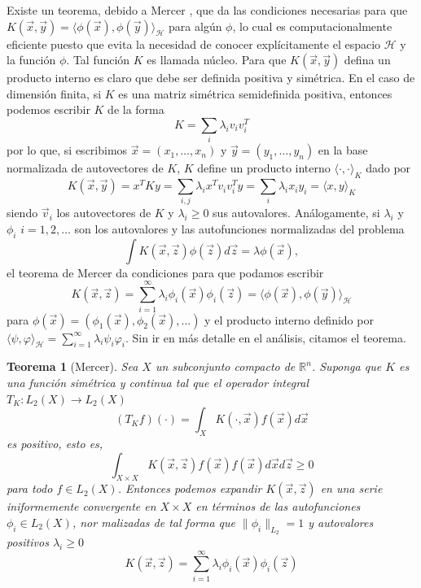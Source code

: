 \documentclass[letterpaper,12pt]{book}
\newtheorem{theorem}{Teorema}
\begin{document}
Existe un teorema, debido a Mercer \cite{mercer_functions_1909}, que da las condiciones necesarias para que $K(\vec{x},\vec{y}) = \langle\phi(\vec{x}),\phi(\vec{y})\rangle_{\mathcal{H}}$ para algún $\phi$, lo cual es computacionalmente eficiente puesto que evita la necesidad de conocer explícitamente el espacio $\mathcal{H}$ y la función $\phi$. Tal función $K$ es llamada núcleo. Para que $K(\vec{x},\vec{y})$ defina un producto interno es claro que debe ser definida positiva y simétrica. En el caso de dimensión finita, si $K$ es una matriz simétrica semidefinida positiva, entonces podemos escribir $K$ de la forma
\begin{equation}
 K =\sum_i\lambda_i v_iv_i^T
\end{equation}
por lo que, si escribimos $\vec{x} = (x_1,\dots,x_n)$ y $\vec{y}=(y_1,\dots,y_n)$ en la base normalizada de autovectores de $K$, $K$ define un producto interno $\langle\cdot,\cdot\rangle_{K}$ dado por
\begin{equation}
 K(\vec{x},\vec{y}) =x^TKy = \sum_{i,j}\lambda_ix^Tv_iv_i^Ty = \sum_i \lambda_ix_iy_i = \langle x,y\rangle_{K}
\end{equation}
siendo $\vec{v}_i$ los autovectores de $K$ y $\lambda_i\geq 0$ sus autovalores. Análogamente, si $\lambda_i$ y $\phi_i$ $i = 1,2,\dots$ son los autovalores y las autofunciones normalizadas del problema
\begin{equation}
  \int K(\vec{x},\vec{z})\phi(\vec{z})d\vec{z} = \lambda\phi(\vec{x}), 
\end{equation}
el teorema de Mercer da condiciones para que podamos escribir 
\begin{equation}
  K(\vec{x},\vec{z}) = \sum_{i=1}^{\infty}\lambda_i\phi_i(\vec{x})\phi_i(\vec{z}) =  \langle \phi(\vec{x}), \phi(\vec{y})\rangle_{\mathcal{H}}
\end{equation}
para $\phi(\vec{x}) = (\phi_1(\vec{x}), \phi_2(\vec{x}),\dots)$ y el producto interno definido por $\langle \psi,\varphi \rangle_{\mathcal{H}} = \sum_{i=1}^{\infty}\lambda_i\psi_i\varphi_i$. Sin ir en más detalle en el análisis, citamos el teorema.
\begin{theorem}[Mercer]
  Sea $X$ un subconjunto compacto de $\mathbb{R}^n$. Suponga que $K$ es una función simétrica y continua tal que el operador integral $T_K:L_2(X)\to L_2(X)$
  \begin{equation*}
    (T_Kf)(\cdot)=\int_{X}K(\cdot,\vec{x})f(\vec{x})d\vec{x}
  \end{equation*}
  es positivo, esto es,
  \begin{equation*}
    \int_{X\times X}K(\vec{x},\vec{z})f(\vec{x})f(\vec{x})d\vec{x}d\vec{z}\geq 0
  \end{equation*} 
  para todo $f\in L_2(X)$. Entonces podemos expandir $K(\vec{x},\vec{z})$ en una serie iniformemente convergente en $X\times X$ en términos de las autofunciones $\phi_i\in L_2(X)$, nor malizadas de tal forma que $\|\phi_i\|_{L_2}=1$ y autovalores positivos $\lambda_i\geq 0$
  \begin{equation*}
    K(\vec{x},\vec{z}) = \sum_{i=1}^{\infty}\lambda_i\phi_i(\vec{x})\phi_i(\vec{z})
  \end{equation*}
\end{theorem}
\end{document}

